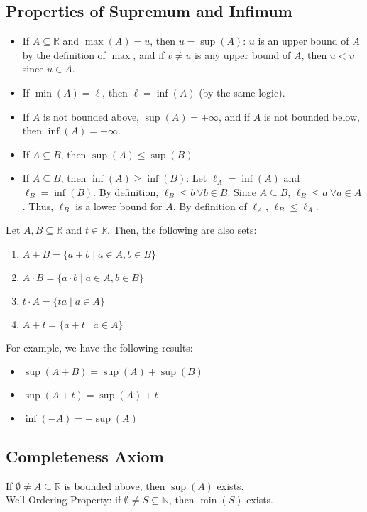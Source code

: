 \documentclass[10pt]{extarticle}
\newcommand{\N}{\mathbb{N}}
\newcommand{\R}{\mathbb{R}}
\begin{document}
  \subsection{Properties of Supremum and Infimum}%
    \begin{itemize}
      \item If $A \subseteq \R$ and $\max(A) = u$, then $u = \sup(A)$: $u$ is an upper bound of $A$ by the definition of $\max$, and if $v\neq u$ is any upper bound of $A$, then $u < v$ since $u\in A$.
      \item If $\min(A) = \ell$, then $\ell = \inf(A)$ (by the same logic).
      \item If $A$ is not bounded above, $\sup(A) = +\infty$, and if $A$ is not bounded below, then $\inf(A) = -\infty$.
      \item If $A\subseteq B$, then $\sup(A) \leq \sup(B)$.
      \item If $A\subseteq B$, then $\inf(A) \geq \inf(B)$: Let $\ell_A = \inf(A)$ and $\ell_B = \inf(B)$. By definition, $\ell_B \leq b~\forall b\in B$. Since $A\subseteq B$, $\ell_B \leq a~\forall a\in A$. Thus, $\ell_B$ is a lower bound for $A$. By definition of $\ell_A$, $\ell_B \leq \ell_A$.
    \end{itemize}
    Let $A,B\subseteq \R$ and $t\in\R$. Then, the following are also sets:
    \begin{enumerate}[(1)]
      \item $A + B = \{a+b\mid a\in A,b\in B\}$
      \item $A\cdot B = \{a\cdot b\mid a\in A,b\in B\}$
      \item $t\cdot A = \{ta\mid a\in A\}$
      \item $A + t = \{a+t\mid a\in A\}$
    \end{enumerate}
    For example, we have the following results:
    \begin{itemize}
      \item $\sup(A+B) = \sup(A) + \sup(B)$
      \item $\sup(A+t) = \sup(A) + t$
      \item $\inf(-A) = -\sup(A)$
    \end{itemize}
  \subsection{Completeness Axiom}%
    If $\emptyset\neq A\subseteq \R$ is bounded above, then $\sup(A)$ exists.\\

    Well-Ordering Property: if $\emptyset \neq S\subseteq \N$, then $\min(S)$ exists.\\
\end{document}
